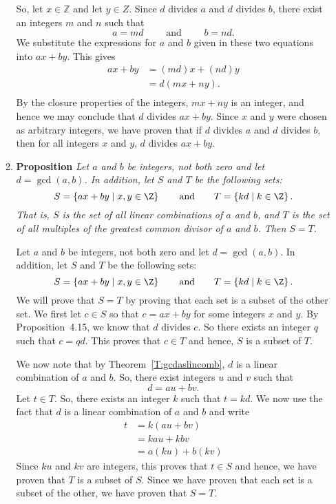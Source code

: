 \begin{enumerate}
\begin{enumerate}
\begin{myproof}
So, let  $x \in \mathbb{Z}$ and let  $y \in Z$.  Since  $d$  divides  $a$ and $d$ divides $b$, there exist an integers  $m$ and $n$  such that
\[
a = md \qquad \text{ and } \qquad b = nd.
\]
We substitute the expressions for  $a$  and  $b$  given in these two equations into  $ax + by$.  This gives
\[
\begin{aligned}
  ax + by &= \left( {md} \right)x + \left( {nd} \right)y \\ 
          &= d\left( {mx + ny} \right). \\ 
\end{aligned} 
\]
By the closure properties of the integers,  $mx + ny$ is an integer, and hence we may conclude that  $d$  divides  $ax + by$.  Since  $x$  and  $y$  were chosen as arbitrary integers, we have proven that if  $d$  divides  $a$  and  $d$  divides  $b$, then for all integers  $x$  and  $y$,  $d$  divides  $ax + by$.
\end{myproof}

\item \textbf{Proposition} \emph{Let $a$ and $b$ be integers, not both zero and let 
$d = \gcd \left(a, b \right)$.  In addition, let $S$ and $T$ be the following sets:
\[
S = \left\{ ax + by \mid x, y \in \Z \right\} \qquad \text{and} \qquad 
T = \left\{ kd \mid k \in \Z \right\}.
\]
That is, $S$ is the set of all linear combinations of $a$ and $b$, and $T$ is the set of all multiples of the greatest common divisor of $a$ and $b$.  Then $S = T$}.

\begin{myproof}
Let $a$ and $b$ be integers, not both zero and let 
$d = \gcd \left(a, b \right)$.  In addition, let $S$ and $T$ be the following sets:
\[
S = \left\{ ax + by \mid x, y \in \Z \right\} \qquad \text{and} \qquad 
T = \left\{ kd \mid k \in \Z \right\}.
\]
We will prove that $S = T$ by proving that each set is a subset of the other set. We first let $c \in S$ so that $c = ax + by$ for some integers $x$ and $y$.  By Proposition~4.15, we know that $d$ divides $c$.  So there exists an integer $q$ such that $c = qd$.  This proves that $c \in T$ and hence, $S$ is a subset of $T$. 


We now note that by Theorem~\ref{T:gcdaslincomb}, $d$ is a linear combination of $a$ and $b$.  So, there exist integers $u$ and $v$ such that
\[
d = au + bv.
\]
Let $t \in T$.  So, there exists an integer $k$ such that $t = kd$.  We now use the fact that $d$ is a linear combination of $a$ and $b$ and write
\begin{align*}
t &= k \left( au + bv \right) \\
  &= kau + kbv \\
  &= a(ku) + b(kv)
\end{align*}
Since $ku$ and $kv$ are integers, this proves that $t \in S$ and hence, we have proven that $T$ is a subset of $S$.  Since we have proven that each set is a subset of the other, we have proven that $S = T$.
\end{myproof}


\end{enumerate}

\end{enumerate}

\hbreak
\endinput
